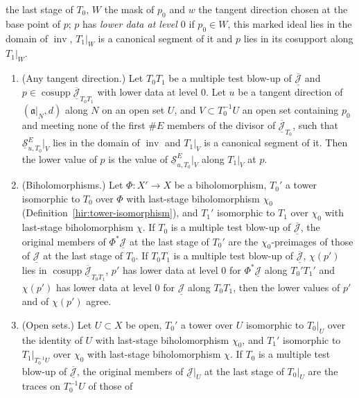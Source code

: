 \begin{theorem}
the last stage of \(T_0\), \(W\) the mask of \(p_0\) and \(w\) the tangent direction chosen at the base point of \(p\); \(p\) has \emph{lower data at level \(0\)} if
\(p_0\in W\), this marked ideal lies in the domain of \(\operatorname{inv}\), \(T_1|_W\) is a canonical segment of it and \(p\) lies in its cosupport along \(T_1|_W\).
\begin{enumerate}
\item (Any tangent direction.) Let \(T_0T_1\) be a multiple test blow-up of \(\overline{\underline{\mathcal J}}\) and \(p\in\operatorname{cosupp}\overline{\underline{\mathcal J}}_{T_0T_1}\)
with lower data at level \(0\). Let \(u\) be a tangent direction of \((\mathfrak a|_N,d)\) along \(N\) on an open set \(U\), and \(V\subset T_0^{-1}U\) an open set containing
\(p_0\) and meeting none of the first \(\#E\) members of the divisor of \(\overline{\underline{\mathcal J}}_{T_0}\), such that \(\underline{\mathcal S}^E_{u,T_0}|_V\) lies in the
domain of \(\operatorname{inv}\) and \(T_1|_V\) is a canonical segment of it. Then the lower value of \(p\) is the value of \(\underline{\mathcal S}^E_{u,T_0}|_V\) along
\(T_1|_V\) at \(p\).
\item (Biholomorphisms.) Let \(\Phi\colon X'\to X\) be a biholomorphism, \(T_0'\) a tower isomorphic to \(T_0\) over \(\Phi\) with last-stage biholomorphism \(\chi_0\)
(Definition~\ref{hir:tower-isomorphism}), and \(T_1'\) isomorphic to \(T_1\) over \(\chi_0\) with last-stage biholomorphism \(\chi\). If \(T_0\) is a multiple test blow-up of
\(\overline{\underline{\mathcal J}}\), the original members of \(\Phi^*\underline{\mathcal J}\) at the last stage of \(T_0'\) are the \(\chi_0\)-preimages of those of
\(\underline{\mathcal J}\) at the last stage of \(T_0\). If \(T_0T_1\) is a multiple test blow-up of \(\overline{\underline{\mathcal J}}\), \(\chi(p')\) lies in
\(\operatorname{cosupp}\overline{\underline{\mathcal J}}_{T_0T_1}\), \(p'\) has lower data at level \(0\) for \(\Phi^*\underline{\mathcal J}\) along \(T_0'T_1'\) and \(\chi(p')\)
has lower data at level \(0\) for \(\underline{\mathcal J}\) along \(T_0T_1\), then the lower values of \(p'\) and of \(\chi(p')\) agree.
\item (Open sets.) Let \(U\subset X\) be open, \(T_0'\) a tower over \(U\) isomorphic to \(T_0|_U\) over the identity of \(U\) with last-stage biholomorphism
\(\chi_0\), and \(T_1'\) isomorphic to \(T_1|_{T_0^{-1}U}\) over \(\chi_0\) with last-stage biholomorphism \(\chi\). If \(T_0\) is a multiple test blow-up of
\(\overline{\underline{\mathcal J}}\), the original members of \(\underline{\mathcal J}|_U\) at the last stage of \(T_0|_U\) are the traces on \(T_0^{-1}U\) of those of

\end{enumerate}
\end{theorem}
